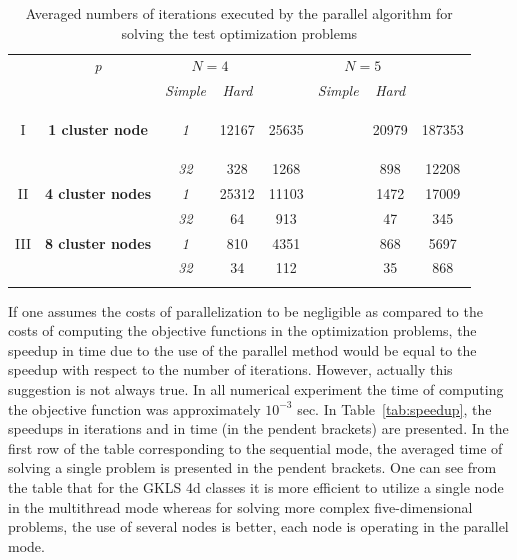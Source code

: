 \documentclass[runningheads]{llncs}
\begin{document}
\begin{table}
  \centering
  \caption{Averaged numbers of iterations executed by the parallel algorithm for solving the test
optimization problems}
  \label{tab:iterations}
  \begin{tabular}{cccccccc}
    \cline{3-8}\noalign{\smallskip}
    \multicolumn{2}{c}{  } & \textit{p} & \multicolumn{2}{c}{$N=4$} & &
\multicolumn{2}{c}{$N=5$}   \\
    \noalign{\smallskip} \cline{4-5} \cline{7-8}  \noalign{\smallskip}
    \multicolumn{2}{c}{  } & & \textit{Simple} & \textit{Hard} & & \textit{Simple} &
\textit{Hard}  \\
    \noalign{\smallskip}\hline
    I &
    \parbox{0.25\textwidth}{
    \begin{center}
    \textbf{1 cluster node}
    \end{center}		}
      & \textit{1} & 12167 & 25635 & & 20979 & 187353  \\
    &  & \textit{32} & 328 & 1268  & &   898 & 12208 \\
    \hline \noalign{\smallskip}
II  & \textbf{4 cluster nodes}  %
  & \textit{1} & 25312 & 11103 & & 1472 & 17009 \\
&   & \textit{32} & 64 &   913 & & 47 & 345 \\
    \noalign{\smallskip}\hline	\noalign{\smallskip}
III & \textbf{8 cluster nodes} %
  & \textit{1}  & 810 & 4351 & & 868 & 5697  \\
& & \textit{32} & 34  & 112  & & 35  & 868 \\
    \noalign{\smallskip}\hline
  \end{tabular}
\end{table}

If one assumes the costs of parallelization to be negligible as compared to the costs of
computing the objective functions in the optimization problems, the speedup in time due to the
use of the parallel method would be equal to the speedup with respect to the number of
iterations. However, actually this suggestion is not always true. In all numerical experiment the
time of computing the objective function was approximately $10^{-3}$ sec. In
Table~\ref{tab:speedup}, the speedups in iterations and in time (in the pendent brackets) are
presented. In the first row of the table corresponding to the sequential mode, the averaged time
of solving a single problem is presented in the pendent brackets. One can see from the table that
for the GKLS 4d classes it is more efficient to utilize a single node in the multithread mode
whereas for solving more complex five-dimensional problems, the use of several nodes is better,
each node is operating in the parallel mode.
\end{document}
